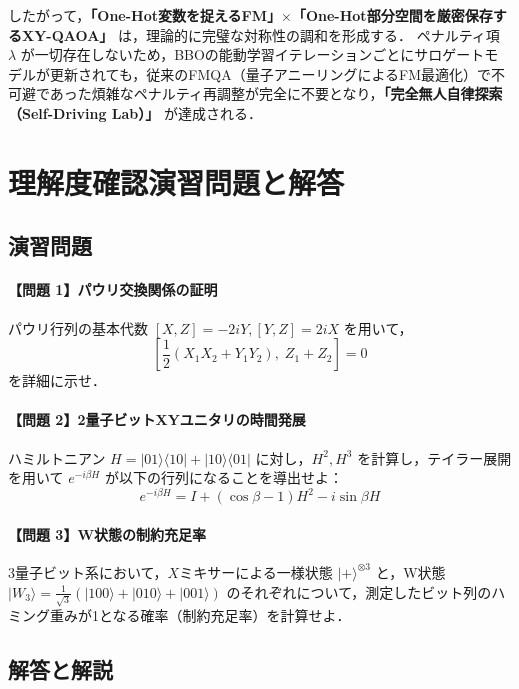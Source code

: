\documentclass[11pt,a4paper,oneside,openany]{ltjsbook}
\theoremstyle{definition}
\theoremstyle{plain}
\theoremstyle{remark}
\newcommand{\ket}[1]{|#1\rangle}
\newcommand{\bra}[1]{\langle#1|}
\begin{document}
したがって，\textbf{「One-Hot変数を捉えるFM」$\times$「One-Hot部分空間を厳密保存するXY-QAOA」} は，理論的に完璧な対称性の調和を形成する．
ペナルティ項 $\lambda$ が一切存在しないため，BBOの能動学習イテレーションごとにサロゲートモデルが更新されても，従来のFMQA（量子アニーリングによるFM最適化\cite{kitai2020designing}）で不可避であった煩雑なペナルティ再調整が完全に不要となり，\textbf{「完全無人自律探索（Self-Driving Lab）」} が達成される．

\chapter{理解度確認演習問題と解答}

\section{演習問題}

\subsubsection*{【問題 1】パウリ交換関係の証明}
パウリ行列の基本代数 $[X, Z] = -2iY, [Y, Z] = 2iX$ を用いて，
\begin{equation}
    \left[ \frac{1}{2}(X_1 X_2 + Y_1 Y_2), \; Z_1 + Z_2 \right] = 0
\end{equation}
を詳細に示せ．

\subsubsection*{【問題 2】2量子ビットXYユニタリの時間発展}
ハミルトニアン $H = \ket{01}\bra{10} + \ket{10}\bra{01}$ に対し，$H^2, H^3$ を計算し，テイラー展開を用いて $e^{-i \beta H}$ が以下の行列になることを導出せよ：
\begin{equation}
    e^{-i \beta H} = I + (\cos\beta - 1) H^2 - i \sin\beta H
\end{equation}

\subsubsection*{【問題 3】W状態の制約充足率}
3量子ビット系において，$X$ミキサーによる一様状態 $\ket{+}^{\otimes 3}$ と，W状態 $\ket{W_3} = \frac{1}{\sqrt{3}}(\ket{100} + \ket{010} + \ket{001})$ のそれぞれについて，測定したビット列のハミング重みが1となる確率（制約充足率）を計算せよ．

\section{解答と解説}
\end{document}
